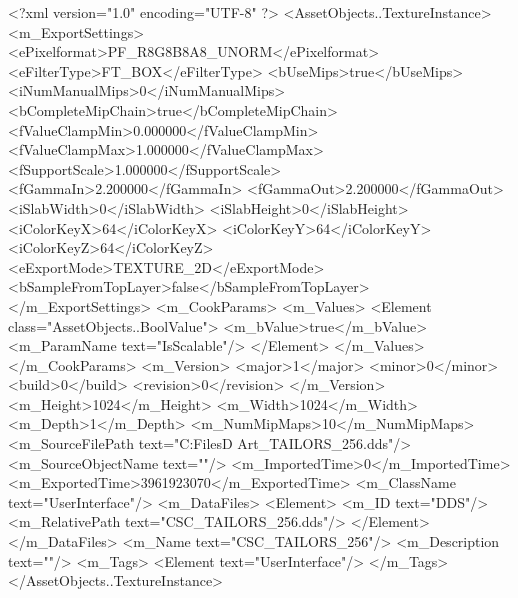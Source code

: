 <?xml version="1.0" encoding="UTF-8" ?>
<AssetObjects..TextureInstance>
	<m_ExportSettings>
		<ePixelformat>PF_R8G8B8A8_UNORM</ePixelformat>
		<eFilterType>FT_BOX</eFilterType>
		<bUseMips>true</bUseMips>
		<iNumManualMips>0</iNumManualMips>
		<bCompleteMipChain>true</bCompleteMipChain>
		<fValueClampMin>0.000000</fValueClampMin>
		<fValueClampMax>1.000000</fValueClampMax>
		<fSupportScale>1.000000</fSupportScale>
		<fGammaIn>2.200000</fGammaIn>
		<fGammaOut>2.200000</fGammaOut>
		<iSlabWidth>0</iSlabWidth>
		<iSlabHeight>0</iSlabHeight>
		<iColorKeyX>64</iColorKeyX>
		<iColorKeyY>64</iColorKeyY>
		<iColorKeyZ>64</iColorKeyZ>
		<eExportMode>TEXTURE_2D</eExportMode>
		<bSampleFromTopLayer>false</bSampleFromTopLayer>
	</m_ExportSettings>
	<m_CookParams>
		<m_Values>
			<Element class="AssetObjects..BoolValue">
				<m_bValue>true</m_bValue>
				<m_ParamName text="IsScalable"/>
			</Element>
		</m_Values>
	</m_CookParams>
	<m_Version>
		<major>1</major>
		<minor>0</minor>
		<build>0</build>
		<revision>0</revision>
	</m_Version>
	<m_Height>1024</m_Height>
	<m_Width>1024</m_Width>
	<m_Depth>1</m_Depth>
	<m_NumMipMaps>10</m_NumMipMaps>
	<m_SourceFilePath text="C:\Users\Shadow\Desktop\Working Files\2D Art\Quarters\Tailors\CSC_TAILORS_256.dds"/>
	<m_SourceObjectName text=""/>
	<m_ImportedTime>0</m_ImportedTime>
	<m_ExportedTime>3961923070</m_ExportedTime>
	<m_ClassName text="UserInterface"/>
	<m_DataFiles>
		<Element>
			<m_ID text="DDS"/>
			<m_RelativePath text="CSC_TAILORS_256.dds"/>
		</Element>
	</m_DataFiles>
	<m_Name text="CSC_TAILORS_256"/>
	<m_Description text=""/>
	<m_Tags>
		<Element text="UserInterface"/>
	</m_Tags>
</AssetObjects..TextureInstance>
